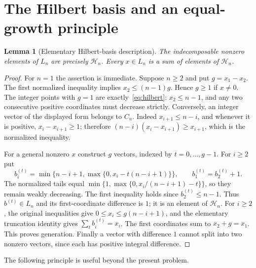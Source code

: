 \documentclass[11pt]{article}
\newtheorem{lemma}[theorem]{Lemma}
\theoremstyle{definition}
\theoremstyle{remark}
\begin{document}
\section{The Hilbert basis and an equal-growth principle}
\begin{lemma}[Elementary Hilbert-basis description]\label{lem:hilbert}
The indecomposable nonzero elements of $L_n$ are precisely $\mathcal H_n$.
Every $x\in L_n$ is a sum of elements of $\mathcal H_n$.
\end{lemma}
\begin{proof}
For $n=1$ the assertion is immediate. Suppose $n\ge2$ and put
$g=x_1-x_2$. The first normalized inequality implies
$x_2\le(n-1)g$. Hence $g\ge1$ if $x\ne0$.
The integer points with $g=1$ are exactly~\eqref{eq:hilbert}:
$x_2\le n-1$, and any two consecutive positive coordinates must decrease
strictly. Conversely, an integer vector of the displayed form belongs to
$C_n$. Indeed $x_{i+1}\le n-i$, and whenever it is positive,
$x_i-x_{i+1}\ge1$; therefore
$(n-i)(x_i-x_{i+1})\ge x_{i+1}$, which is the normalized inequality.

For a general nonzero $x$ construct $g$ vectors, indexed by $t=0,\ldots,g-1$.
For $i\ge2$ put
\[
 b_i^{(t)}=\min\{n-i+1,\max\{0,x_i-t(n-i+1)\}\},\qquad
 b_1^{(t)}=b_2^{(t)}+1.
\]
The normalized tails equal
$\min\{1,\max\{0,x_i/(n-i+1)-t\}\}$, so they remain weakly decreasing.
The first inequality holds since $b_2^{(t)}\le n-1$.
Thus $b^{(t)}\in L_n$ and its first-coordinate difference is $1$; it is
an element of $\mathcal H_n$.
For $i\ge2$, the original inequalities give
$0\le x_i\le g(n-i+1)$, and the elementary truncation identity gives
$\sum_t b_i^{(t)}=x_i$. The first coordinates sum to $x_2+g=x_1$.
This proves generation. Finally a vector with difference $1$ cannot split
into two nonzero vectors, since each has positive integral difference.
\end{proof}

The following principle is useful beyond the present problem.
\end{document}
